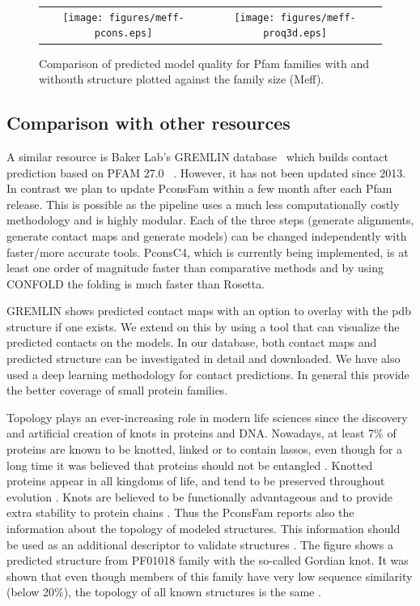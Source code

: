 \documentclass[a4,center,fleqn]{NAR}
\begin{document}
\begin{figure}[t]
\begin{center}
\begin{tabular}{cc}
    \texttt{[image: figures/meff-pcons.eps]}&
    \texttt{[image: figures/meff-proq3d.eps]}\\
\end{tabular}
\end{center}
\caption{Comparison of predicted model quality for Pfam families with
  and withouth structure plotted against the family size (Meff).}
\label{fig:overview}
\end{figure}


\subsection{Comparison with other resources}

A similar resource is Baker Lab’s GREMLIN
database~\cite{Kamisetty2013} which builds contact prediction based on
PFAM 27.0~\cite{Sonnhammer:1997} . However, it has not been updated
since 2013. In contrast we plan to update PconsFam within a few month
after each Pfam release. This is possible as the pipeline uses a much
less computationally costly methodology and is highly modular. Each of
the three steps (generate alignments, generate contact maps and
generate models) can be changed independently with faster/more
accurate tools. PconsC4, which is currently being implemented, is at
least one order of magnitude faster than comparative methods and by
using CONFOLD the folding is much faster than Rosetta.


GREMLIN shows predicted contact maps with an option to overlay with
the pdb structure if one exists. We extend on this by using a tool
that can visualize the predicted contacts on the models. In our
database, both contact maps and predicted structure can be
investigated in detail and downloaded.  We have also used a deep
learning methodology for contact predictions. In general this provide
the better coverage of small protein families.


Topology plays an ever-increasing role in modern life sciences since
the discovery and artificial creation of knots in proteins and DNA.
Nowadays, at least 7\% of proteins are known to be knotted, linked or
to contain lassos, even though for a long time it was believed that
proteins should not be entangled \cite{sulkowska2018entangled}. Knotted proteins appear in all
kingdoms of life, and tend to be preserved throughout evolution \cite{sulkowska2012conservation}. 
Knots are believed to be functionally advantageous and to provide extra
stability to protein chains \cite{christian2016methyl}.
Thus the PconsFam reports also the information about the topology of
modeled structures. This information should be used as an additional
descriptor to validate structures \cite{khatib2006rapid}. The figure shows a
predicted structure from PF01018 family with the so-called Gordian
knot. It was shown that even though members of this family have very
low sequence similarity (below 20\%), the topology of all known
structures is the same \cite{sulkowska2012conservation}.
\end{document}
